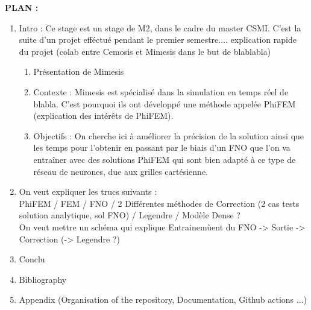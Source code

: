\documentclass[12pt]{article}
\begin{document}
	\nocite{*}
	
	
	
	\tableofcontents
	
	\newpage
	
	\textbf{PLAN :}
	
	\begin{enumerate}
		\item Intro : Ce stage est un stage de M2, dans le cadre du master CSMI. C'est la suite d'un projet efféctué pendant le premier semestre.... explication rapide du projet (colab entre Cemosis et Mimesis dans le but de blablabla)
		\begin{enumerate}
			\item Présentation de Mimesis
			\item Contexte : Mimesis est spécialisé dans la simulation en temps réel de blabla. C'est pourquoi ils ont développé une méthode appelée PhiFEM (explication des intérêts de PhiFEM).
			\item Objectifs : On cherche ici à améliorer la précision de la solution ainsi que les temps pour l'obtenir en passant par le biais d'un FNO que l'on va entraîner avec des solutions PhiFEM qui sont bien adapté à ce type de réseau de neurones, due aux grilles cartésienne.
		\end{enumerate}
		\item On veut expliquer les trucs suivants : \\
		PhiFEM / FEM / FNO / 2 Différentes méthodes de Correction (2 cas tests solution analytique, sol FNO) / Legendre / Modèle Dense ?  \\
		On veut mettre un schéma qui explique Entrainemùent du FNO -> Sortie -> Correction (-> Legendre ?)
		\item Conclu
		\item Bibliography
		\item Appendix (Organisation of the repository, Documentation, Github actions ...)
	\end{enumerate}

	\newpage
	
	
	
	
\end{document}
